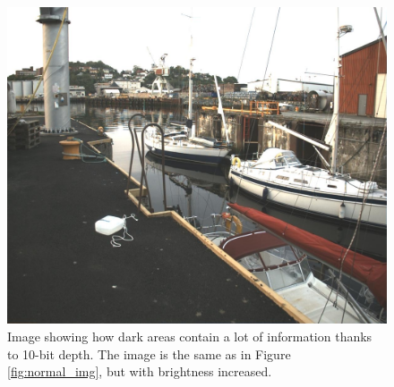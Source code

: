 \begin{figure}[H]
    \centering
    \includegraphics[width=.8\textwidth]{figures/pictures/gained_right_96.jpeg}
    \caption{Image showing how dark areas contain a lot of information thanks to 10-bit depth.
        The image is the same as in Figure \ref{fig:normal_img}, but with brightness increased.}
    \label{fig:gained_image}
\end{figure}

